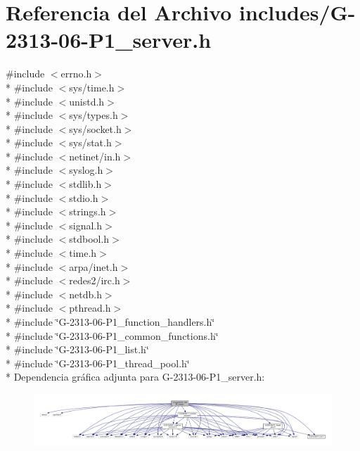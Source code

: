 \hypertarget{G-2313-06-P1__server_8h}{}\section{Referencia del Archivo includes/\+G-\/2313-\/06-\/\+P1\+\_\+server.h}
\label{G-2313-06-P1__server_8h}
{\ttfamily \#include $<$errno.\+h$>$}\\*
{\ttfamily \#include $<$sys/time.\+h$>$}\\*
{\ttfamily \#include $<$unistd.\+h$>$}\\*
{\ttfamily \#include $<$sys/types.\+h$>$}\\*
{\ttfamily \#include $<$sys/socket.\+h$>$}\\*
{\ttfamily \#include $<$sys/stat.\+h$>$}\\*
{\ttfamily \#include $<$netinet/in.\+h$>$}\\*
{\ttfamily \#include $<$syslog.\+h$>$}\\*
{\ttfamily \#include $<$stdlib.\+h$>$}\\*
{\ttfamily \#include $<$stdio.\+h$>$}\\*
{\ttfamily \#include $<$strings.\+h$>$}\\*
{\ttfamily \#include $<$signal.\+h$>$}\\*
{\ttfamily \#include $<$stdbool.\+h$>$}\\*
{\ttfamily \#include $<$time.\+h$>$}\\*
{\ttfamily \#include $<$arpa/inet.\+h$>$}\\*
{\ttfamily \#include $<$redes2/irc.\+h$>$}\\*
{\ttfamily \#include $<$netdb.\+h$>$}\\*
{\ttfamily \#include $<$pthread.\+h$>$}\\*
{\ttfamily \#include \char`\"{}G-\/2313-\/06-\/\+P1\+\_\+function\+\_\+handlers.\+h\char`\"{}}\\*
{\ttfamily \#include \char`\"{}G-\/2313-\/06-\/\+P1\+\_\+common\+\_\+functions.\+h\char`\"{}}\\*
{\ttfamily \#include \char`\"{}G-\/2313-\/06-\/\+P1\+\_\+list.\+h\char`\"{}}\\*
{\ttfamily \#include \char`\"{}G-\/2313-\/06-\/\+P1\+\_\+thread\+\_\+pool.\+h\char`\"{}}\\*
Dependencia gráfica adjunta para G-\/2313-\/06-\/\+P1\+\_\+server.h\+:\nopagebreak
\begin{figure}[H]
\begin{center}
\leavevmode
\includegraphics[width=350pt]{G-2313-06-P1__server_8h__incl}
\end{center}
\end{figure}
